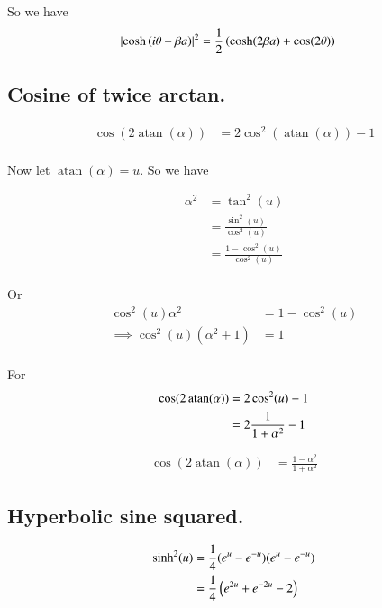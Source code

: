 \documentclass{article}
\DeclareMathOperator{\atan}{atan}
\begin{document}
So we have
\begin{align}\label{eqn:coshSquared}
\left\lvert{\cosh\left( i\theta -\beta a \right)}\right\rvert^2
&=\frac{1}{2}
\left( \cosh(2\beta a) + \cos(2\theta) \right)
\end{align}

\subsection{ Cosine of twice arctan. }

\begin{align*}
\cos(2\atan(\alpha)) 
&= 
2 \cos^2\left( \atan(\alpha) \right) -1 \\
\end{align*}

Now let $\atan(\alpha) = u$.  So we have

\begin{align*}
\alpha^2 
&=
\tan^2(u)  \\
&=
\frac{\sin^2(u)}{\cos^2(u)} \\
&=
\frac{1 -\cos^2(u)}{\cos^2(u)} \\
\end{align*}

Or
\begin{align*}
\cos^2(u) \alpha^2 &= 1 - \cos^2(u) \\
\implies
\cos^2(u) (\alpha^2 +1 ) &= 1 \\
\end{align*}

For 
\begin{align*}
\cos(2\atan(\alpha)) 
&= 
2 \cos^2( u ) -1 \\
&= 
2 \inv{1 + \alpha^2} -1 \\
\end{align*}

\begin{align}\label{eqn:cosineTwiceArcTan}
\cos(2\atan(\alpha)) 
&= 
\frac{1 - \alpha^2}{1 + \alpha^2}
\end{align}

\subsection{ Hyperbolic sine squared. }

\begin{align*}
\sinh^2(u) 
&=
\frac{1}{4} (e^u - e^{-u}) (e^u - e^{-u}) \\
&=
\frac{1}{4} \left(e^{2u} + e^{-2u} -2 \right) \\
\end{align*}
\end{document}

